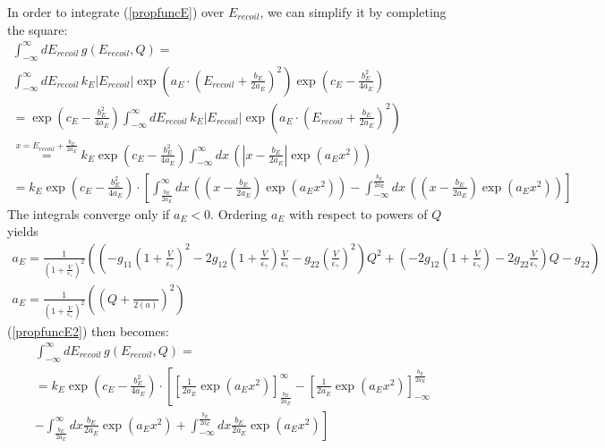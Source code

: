 In order to integrate (\ref{propfuncE}) over $E_{recoil}$, we can simplify it 
by completing the square:
\begin{gather}
\int_{-\infty}^{\infty} dE_{recoil} \, g(E_{recoil},Q) = \\
\int_{-\infty}^{\infty} dE_{recoil} \, k_E \left| E_{recoil} \right| 
\exp \left( a_E \cdot \left( E_{recoil} + \frac{b_E}{2 a_E} \right)^2 \right)
\exp \left( c_E - \frac{b_E^2}{4 a_E} \right) \\
= \exp \left( c_E - \frac{b_E^2}{4 a_E} \right)
\int_{-\infty}^{\infty} dE_{recoil} \, k_E \left| E_{recoil} \right| 
\exp \left( a_E \cdot \left(E_{recoil} + \frac{b_E}{2 a_E} \right)^2 \right) \\
\overset{x = E_{recoil} + \frac{b_E}{2 a_E}}{=} k_E
\exp \left( c_E - \frac{b_E^2}{4 a_E} \right)
 \int_{-\infty}^{\infty} dx \, \left(
\left| x - \frac{b_E}{2 a_E} \right| \exp \left( a_E x^2 \right) \right) \\
= k_E \exp \left( c_E - \frac{b_E^2}{4 a_E} \right) \cdot
\left[ \int_{\frac{b_E}{2 a_E}}^\infty dx \, \left(
\left( x - \frac{b_E}{2 a_E} \right) \exp \left( a_E x^2 \right) \right)
- \int_{-\infty}^{\frac{b_E}{2 a_E}} dx \,  \left(
\left( x - \frac{b_E}{2 a_E} \right) \exp \left( a_E x^2 \right) \right) \right]
\label{propfuncE2}
\end{gather}
The integrals converge only if $a_E<0$.
Ordering $a_E$ with respect to powers of $Q$ yields
\begin{gather}
a_E = \frac{1}{\left( 1 + \frac{V}{\epsilon_\gamma} \right)^2} \left(
\left(  - g_{11} \left( 1 + \frac{V}{\epsilon_\gamma} \right)^2 - 2 g_{12}
\left( 1 + \frac{V}{\epsilon_\gamma} \right) \frac{V}{\epsilon_\gamma}
- g_{22} \left( \frac{V}{\epsilon_\gamma} \right)^2 \right)
Q^2 + \left( -2 g_{12} \left( 1 + \frac{V}{\epsilon_\gamma} \right) - 2 g_{22}
\frac{V}{\epsilon_\gamma} \right) Q - g_{22} \right) \\
a_E = \frac{1}{\left( 1 + \frac{V}{\epsilon_\gamma} \right)^2} \left(
\left( Q +  \frac{}{2 \left( a \right)} \right)^2 \right) 
\end{gather}
(\ref{propfuncE2}) then becomes:
\begin{gather}
\int_{-\infty}^{\infty} dE_{recoil} \, g(E_{recoil},Q) = \\
= k_E \exp \left( c_E - \frac{b_E^2}{4 a_E} \right) \cdot \left[ 
\left[ \frac{1}{2 a_E} \exp (a_E x^2) \right]_{\frac{b_E}{2 a_E}}^{\infty} -
\left[ \frac{1}{2 a_E} \exp (a_E x^2) \right]_{-\infty}^{\frac{b_E}{2 a_E}} \right. \\
\left. - \int_{\frac{b_E}{2 a_E}}^{\infty} dx \frac{b_E}{2 a_E} \exp ( a_E x^2)
+ \int_{-\infty}^{\frac{b_E}{2 a_E}} dx \frac{b_E}{2 a_E} \exp ( a_E x^2) \right] 
\end{gather}
